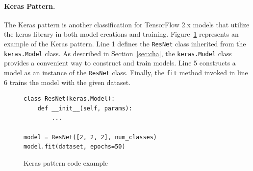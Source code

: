 


\paragraph{Keras Pattern.}
The Keras pattern is another classification for TensorFlow 2.x models that
utilize the keras library in both model creations and training. 
Figure~\ref{fig:keraspattern} represents an example of the Keras pattern.
Line 1 defines the {\tt ResNet} class inherited from the {\tt keras.Model}
class. 
As described in Section~\ref{sec:cha}, the {\tt keras.Model} class provides a
convenient way to construct and train models. 
Line 5 constructs a model as an instance of the {\tt ResNet} class.
Finally, the {\tt fit} method invoked in line 6 trains the model with the given
dataset.


\begin{figure}[ht!]
  \begin{lstlisting}[style=mpython]
class ResNet(keras.Model):
    def __init__(self, params):
        ...

model = ResNet([2, 2, 2], num_classes)
model.fit(dataset, epochs=50)\end{lstlisting}
 
  \caption{Keras pattern code example}
  \label{fig:keraspattern}
\end{figure}

